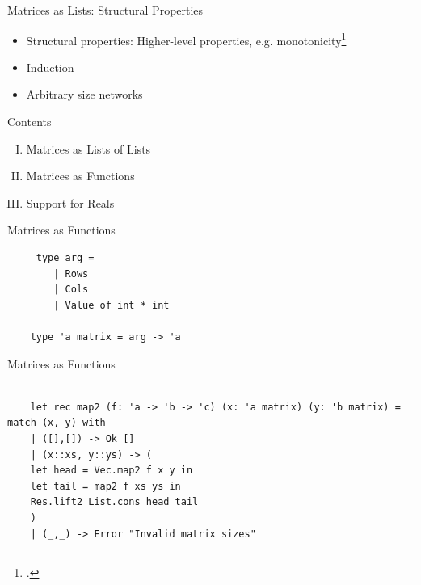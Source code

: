 \documentclass{beamer}
\begin{document}
\begin{frame}{Matrices as Lists: Structural Properties}
	\begin{itemize}
		
	\item<1->{Structural properties: Higher-level properties, e.g. monotonicity\footcite{de_maria_use_2021}}
	
	\item<1->Induction
	
	\item<3->Arbitrary size networks
	\end{itemize}
\end{frame}



\begin{frame}{Contents}
	\begin{enumerate}[I.]
		\item<1> Matrices as Lists of Lists
		\item<2> Matrices as Functions
		\item<0> Support for Reals
	\end{enumerate}
\end{frame}

\begin{frame}[fragile]{Matrices as Functions}
	\begin{lstlisting}
	 type arg =
		| Rows
		| Cols
		| Value of int * int
		
	type 'a matrix = arg -> 'a
	\end{lstlisting}
\end{frame}


\begin{frame}[fragile]{Matrices as Functions}
	\begin{lstlisting}
	
	let rec map2 (f: 'a -> 'b -> 'c) (x: 'a matrix) (y: 'b matrix) = match (x, y) with
	| ([],[]) -> Ok []
	| (x::xs, y::ys) -> (
	let head = Vec.map2 f x y in
	let tail = map2 f xs ys in
	Res.lift2 List.cons head tail
	)
	| (_,_) -> Error "Invalid matrix sizes"

	\end{lstlisting}
\end{frame}
	
\end{document}
